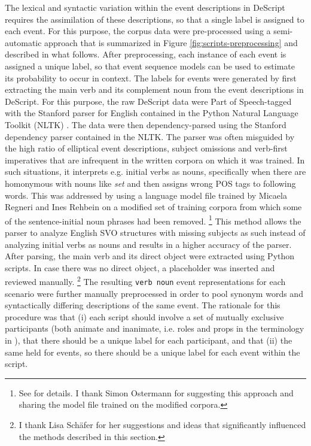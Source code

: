 The lexical and syntactic variation within the event descriptions in DeScript requires the assimilation of these descriptions, so that a single label is assigned to each event. For this purpose, the corpus data were pre-processed using a semi-automatic approach that is summarized in Figure \ref{fig:scripts-preprocessing} and described in what follows. After preprocessing, each instance of each event is assigned a unique label, so that event sequence models can be used to estimate its probability to occur in context. The labels for events were generated by first extracting the main verb and its complement noun from the event descriptions in DeScript. For this purpose, the raw DeScript data were Part of Speech-tagged with the Stanford parser \citep{klein.manning2003} for English contained in the Python Natural Language Toolkit (NLTK) \citep{loper.bird2002}. The data were then dependency-parsed using the Stanford dependency parser contained in the NLTK. The parser was often misguided by the high ratio of elliptical event descriptions, subject omissions and verb-first imperatives that are infrequent in the written corpora on which it was trained. In such situations, it interprets e.g. initial verbs as nouns, specifically when there are homonymous with nouns like \textit{set} and then assigns wrong POS tags to following words. This was addressed by using a language model file trained by Micaela Regneri and Ines Rehbein on a modified set of training corpora from which some of the sentence-initial noun phrases had been removed.%
%
\footnote{See \citet[49--50]{regneri2013} for details. I thank Simon Ostermann for suggesting this approach and sharing the model file trained on the modified corpora.}\afterfn%
%
This method allows the parser to analyze English SVO structures with missing subjects as such instead of analyzing initial verbs as nouns and results in a higher accuracy of the parser. After parsing, the main verb and its direct object were extracted using Python scripts. In case there was no direct object, a placeholder was inserted and reviewed manually.%
% 
\footnote{I thank Lisa Schäfer for her suggestions and ideas that significantly influenced the methods described in this section.}\afterfn%
%
The resulting \texttt{verb noun} event representations for each scenario were further manually preprocessed in order to pool synonym words and syntactically differing descriptions of the same event. The rationale for this procedure was that (i) each script should involve a set of mutually exclusive participants (both animate and inanimate, i.e. roles and props in the terminology in \citet{schank.abelson1977}), that there should be a unique label for each participant, and that (ii) the same held for events, so there should be a unique label for each event within the script.%
